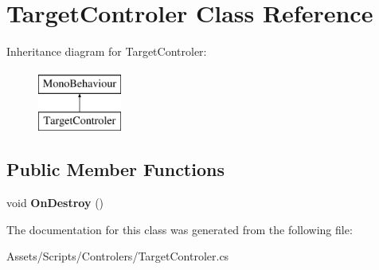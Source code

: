 \hypertarget{class_target_controler}{}\section{Target\+Controler Class Reference}
\label{class_target_controler}
Inheritance diagram for Target\+Controler\+:\begin{figure}[H]
\begin{center}
\leavevmode
\includegraphics[height=2.000000cm]{class_target_controler}
\end{center}
\end{figure}
\subsection*{Public Member Functions}
\begin{DoxyCompactItemize}
\item 
void {\bfseries On\+Destroy} ()\hypertarget{class_target_controler_a09029a1d93f1a05177a4268edfd7a0ce}{}\label{class_target_controler_a09029a1d93f1a05177a4268edfd7a0ce}

\end{DoxyCompactItemize}


The documentation for this class was generated from the following file\+:\begin{DoxyCompactItemize}
\item 
Assets/\+Scripts/\+Controlers/Target\+Controler.\+cs\end{DoxyCompactItemize}
